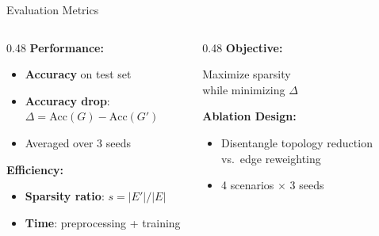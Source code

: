 \documentclass[aspectratio=169]{beamer}
\begin{document}
\begin{frame}{\faChartBar \quad Evaluation Metrics}
    \begin{columns}[T]
        \begin{column}{0.48\textwidth}
            \centering
            \textbf{\textcolor{cyanneon}{\faTrophy \quad Performance:}}
            \begin{itemize}
                \item \textbf{Accuracy} on test set
                \item \textbf{Accuracy drop}: $\Delta = \text{Acc}(G) - \text{Acc}(G')$
                \item Averaged over 3 seeds
            \end{itemize}
            
            \vspace{0.4cm}
            \textbf{\textcolor{violetelectric}{\faClock \quad Efficiency:}}
            \begin{itemize}
                \item \textbf{Sparsity ratio}: $s = |E'|/|E|$
                \item \textbf{Time}: preprocessing + training
            \end{itemize}
        \end{column}
        \begin{column}{0.48\textwidth}
            \centering
            \textbf{\textcolor{magentaneon}{\faBullseye \quad Objective:}}
            \begin{center}
                \alert{Maximize sparsity\\while minimizing $\Delta$}
            \end{center}

            \vspace{0.4cm}
            \textbf{\textcolor{violetelectric}{\faFlask \quad Ablation Design:}}
            \begin{itemize}
                \item Disentangle topology reduction vs.\ edge reweighting
                \item 4 scenarios $\times$ 3 seeds
            \end{itemize}
        \end{column}
    \end{columns}
\end{frame}
\end{document}
